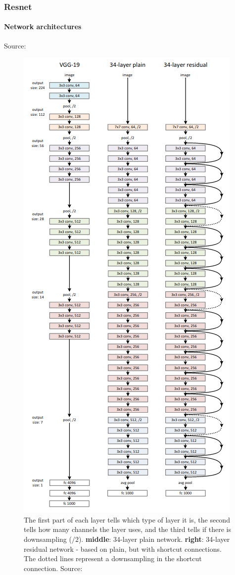 \documentclass{beamer}
\begin{document}
\begin{frame}
    \frametitle{Resnet}
    \framesubtitle{Network architectures}
    
    Source: \cite{resnet}
    \begin{figure}
        \centering
        \includegraphics[scale=0.69]{../assets/residual-net.png}
        \caption{The first part of each layer tells which type of layer it is, the second tells how many channels the layer uses, and the third tells if there is downsampling ($/2$). \textbf{middle}: 34-layer plain network. \textbf{right}: 34-layer residual network - based on plain, but with shortcut connections. The dotted lines represent a downsampling in the shortcut connection. Source: \cite{resnet}}
        \label{fig:resnet}
    \end{figure}
\end{frame}
\end{document}
